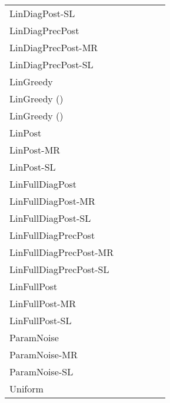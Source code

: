 \documentclass{article} \usepackage{iclr2018_conference,times}
\begin{document}
\begin{landscape}
\begin{table}[ht]
\begin{tabular}{llllll}
LinDiagPost-SL & & & & &  \\
LinDiagPrecPost & & & & & \bm{} \\
LinDiagPrecPost-MR & & & & &  \\
LinDiagPrecPost-SL & & & & &  \\
LinGreedy & & & & &  \\
LinGreedy () & & & & &  \\
LinGreedy () & & & & &  \\
LinPost & & & & &  \\
LinPost-MR & & & & & \bm{} \\
LinPost-SL & & & & &  \\
LinFullDiagPost & & & & &  \\
LinFullDiagPost-MR & & & & &  \\
LinFullDiagPost-SL & & & & &  \\
LinFullDiagPrecPost & & & & \bm{}&  \\
LinFullDiagPrecPost-MR & & & & & \bm{} \\
LinFullDiagPrecPost-SL & & & & &  \\
LinFullPost & & & & \bm{}&  \\
LinFullPost-MR & & & & &  \\
LinFullPost-SL & & & & &  \\
ParamNoise & & & & &  \\
ParamNoise-MR & & & & &  \\
ParamNoise-SL & & & & &  \\
Uniform & & & & &  \\
\bottomrule
\end{tabular}
 \end{table}
\end{landscape}
\end{document}
